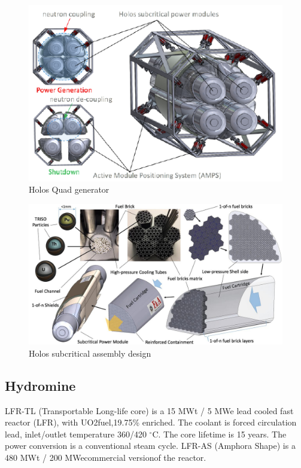 \begin{figure}[hbtp]
\centering
\includegraphics[scale=1]{Figs/holosquad.jpeg}
\caption{Holos Quad generator}
\label{Holosquad}
\end{figure}

\begin{figure}[hbtp]
\centering
\includegraphics[scale=0.3]{Figs/holosfueldesign.jpeg}
\caption{Holos subcritical assembly design}
\label{Holosdesign}
\end{figure}

\pagebreak

\subsection{Hydromine}
LFR-TL (Transportable Long-life core) is a 15 MWt / 5 MWe lead cooled fast reactor (LFR), with UO2fuel,19.75\% enriched. The coolant is forced circulation lead, inlet/outlet temperature 360/420 $^\circ{}$C. The core lifetime is 15 years. The power conversion is a conventional steam cycle. LFR-AS (Amphora Shape) is a 480 MWt / 200 MWecommercial versionof the reactor.

